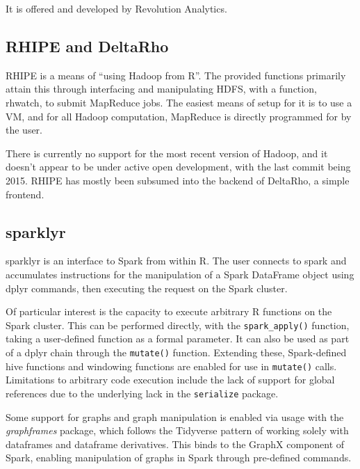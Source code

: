 It is offered and developed by Revolution Analytics.

\hypertarget{sec:rhipe-deltarho}{%
    \subsection{RHIPE and DeltaRho}\label{sec:rhipe-deltarho}}

RHIPE is a means of ``using Hadoop from R''\cite{deltarho:_rhipe}. The
provided functions primarily attain this through interfacing and
manipulating HDFS, with a function, rhwatch, to submit MapReduce jobs.
The easiest means of setup for it is to use a VM, and for all Hadoop
computation, MapReduce is directly programmed for by the user.

There is currently no support for the most recent version of Hadoop, and
it doesn't appear to be under active open development, with the last
commit being 2015. RHIPE has mostly been subsumed into the backend of
DeltaRho, a simple frontend.

\hypertarget{sparklyr}{%
    \subsection{sparklyr}\label{sparklyr}}

sparklyr is an interface to Spark from within R\cite{luraschi20}. The
user connects to spark and accumulates instructions for the manipulation
of a Spark DataFrame object using dplyr commands, then executing the
request on the Spark cluster.

Of particular interest is the capacity to execute arbitrary R functions
on the Spark cluster. This can be performed directly, with the
\texttt{spark_apply()} function, taking a
user-defined function as a formal parameter. It can also be used as part
of a dplyr chain through the \texttt{mutate()}
function. Extending these, Spark-defined hive functions and windowing
functions are enabled for use in
\texttt{mutate()} calls. Limitations to
arbitrary code execution include the lack of support for global
references due to the underlying lack in the \texttt{serialize} package.

Some support for graphs and graph manipulation is enabled via usage with
the \emph{graphframes} package, which follows the Tidyverse pattern of
working solely with dataframes and dataframe derivatives\cite{kuo18}.
This binds to the GraphX component of Spark, enabling manipulation of
graphs in Spark through pre-defined commands.

